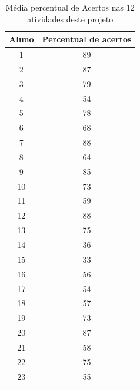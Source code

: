 \begin{table}[htbp] \centering
    \caption{Média percentual de Acertos nas 12 atividades deste projeto} \label{tab:Resultado Final do Projeto}
    \begin{tabular}{|c|c|}
        \hline
        \textbf{Aluno} & \textbf{Percentual de acertos} \\
        \hline
        1              & 89                             \\ \hline
        2              & 87                             \\ \hline
        3              & 79                             \\ \hline
        4              & 54                             \\ \hline
        5              & 78                             \\ \hline
        6              & 68                             \\ \hline
        7              & 88                             \\ \hline
        8              & 64                             \\ \hline
        9              & 85                             \\ \hline
        10             & 73                             \\ \hline
        11             & 59                             \\ \hline
        12             & 88                             \\ \hline
        13             & 75                             \\ \hline
        14             & 36                             \\ \hline
        15             & 33                             \\ \hline
        16             & 56                             \\ \hline
        17             & 54                             \\ \hline
        18             & 57                             \\ \hline
        19             & 73                             \\ \hline
        20             & 87                             \\ \hline
        21             & 58                             \\ \hline
        22             & 75                             \\ \hline
        23             & 55                             \\ \hline
    \end{tabular}
    \legend{\legendaTabela}
\end{table}
\newpage

